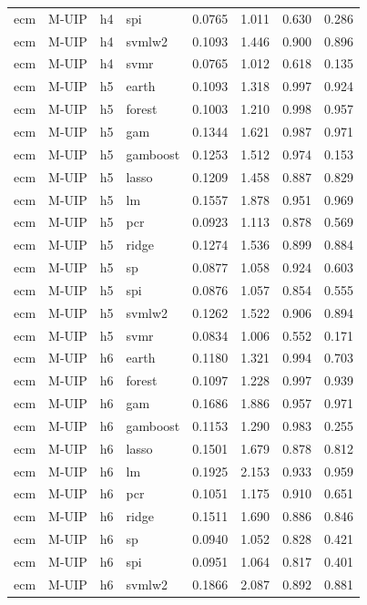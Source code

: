 \begin{ThreePartTable}
\begin{longtable}[t]{llclcccc}
ecm & M-UIP & h4 & spi & 0.0765 & 1.011 & 0.630 & 0.286\\
ecm & M-UIP & h4 & svmlw2 & 0.1093 & 1.446 & 0.900 & 0.896\\
ecm & M-UIP & h4 & svmr & 0.0765 & 1.012 & 0.618 & 0.135\\
\addlinespace
ecm & M-UIP & h5 & earth & 0.1093 & 1.318 & 0.997 & 0.924\\
ecm & M-UIP & h5 & forest & 0.1003 & 1.210 & 0.998 & 0.957\\
ecm & M-UIP & h5 & gam & 0.1344 & 1.621 & 0.987 & 0.971\\
ecm & M-UIP & h5 & gamboost & 0.1253 & 1.512 & 0.974 & 0.153\\
ecm & M-UIP & h5 & lasso & 0.1209 & 1.458 & 0.887 & 0.829\\
ecm & M-UIP & h5 & lm & 0.1557 & 1.878 & 0.951 & 0.969\\
ecm & M-UIP & h5 & pcr & 0.0923 & 1.113 & 0.878 & 0.569\\
ecm & M-UIP & h5 & ridge & 0.1274 & 1.536 & 0.899 & 0.884\\
ecm & M-UIP & h5 & sp & 0.0877 & 1.058 & 0.924 & 0.603\\
ecm & M-UIP & h5 & spi & 0.0876 & 1.057 & 0.854 & 0.555\\
ecm & M-UIP & h5 & svmlw2 & 0.1262 & 1.522 & 0.906 & 0.894\\
ecm & M-UIP & h5 & svmr & 0.0834 & 1.006 & 0.552 & 0.171\\
\addlinespace
ecm & M-UIP & h6 & earth & 0.1180 & 1.321 & 0.994 & 0.703\\
ecm & M-UIP & h6 & forest & 0.1097 & 1.228 & 0.997 & 0.939\\
ecm & M-UIP & h6 & gam & 0.1686 & 1.886 & 0.957 & 0.971\\
ecm & M-UIP & h6 & gamboost & 0.1153 & 1.290 & 0.983 & 0.255\\
ecm & M-UIP & h6 & lasso & 0.1501 & 1.679 & 0.878 & 0.812\\
ecm & M-UIP & h6 & lm & 0.1925 & 2.153 & 0.933 & 0.959\\
ecm & M-UIP & h6 & pcr & 0.1051 & 1.175 & 0.910 & 0.651\\
ecm & M-UIP & h6 & ridge & 0.1511 & 1.690 & 0.886 & 0.846\\
ecm & M-UIP & h6 & sp & 0.0940 & 1.052 & 0.828 & 0.421\\
ecm & M-UIP & h6 & spi & 0.0951 & 1.064 & 0.817 & 0.401\\
ecm & M-UIP & h6 & svmlw2 & 0.1866 & 2.087 & 0.892 & 0.881\\

\end{longtable}
\end{ThreePartTable}
